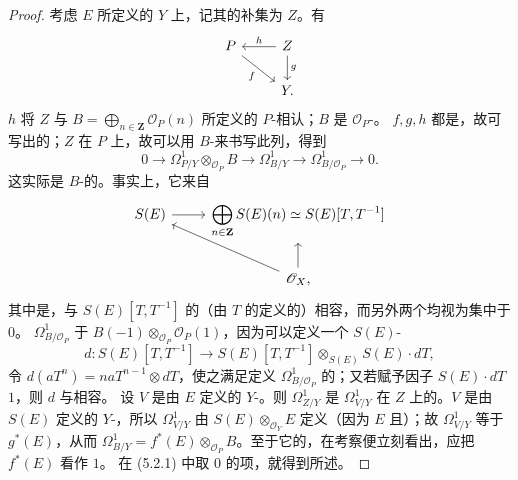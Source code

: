 \begin{proof}
考虑 $E$ 所定义的 $Y$ 上，记其的补集为 $Z$。有
\[
\begin{tikzcd}P\arrow[dr,"f"']&Z\arrow[l,"h"']\arrow[d,"g"]\\&Y.\end{tikzcd}
\]
 $h$ 将 $Z$ 与 $B=\bigoplus_{n\in\mathbf Z}\mathscr O_P(n)$ 所定义的 $P$-相认；$B$ 是 $\mathscr O_P$-。
$f,g,h$ 都是，故可写出的；$Z$ 在 $P$ 上，故可以用 $B$-来书写此列，得到
\[0\longrightarrow\Omega^1_{P/Y}\otimes_{\mathscr O_P}B\longrightarrow\Omega^1_{B/Y}\longrightarrow\Omega^1_{B/\mathscr O_P}\longrightarrow0.\tag{5.2.1}\]
这实际是 $B$-的。事实上，它来自
\[
\begin{tikzcd}S(E)\arrow[r]&\displaystyle\bigoplus_{n\in\mathbf Z}S(E)(n)\simeq S(E)[T,T^{-1}]\\&\mathscr O_X\arrow[ul]\arrow[u],\end{tikzcd}
\]
其中是，与 $S(E)[T,T^{-1}]$ 的（由 $T$ 的定义的）相容，而另外两个均视为集中于
 $0$。
 $\Omega^1_{B/\mathscr O_P}$ 于 $B(-1)\otimes_{\mathscr O_P}\mathscr O_P(1)$，因为可以定义一个 $S(E)$-
\[d:S(E)[T,T^{-1}]\longrightarrow S(E)[T,T^{-1}]\otimes_{S(E)}S(E)\cdot dT,\]
令 $d(aT^n)=naT^{n-1}\otimes dT$，使之满足定义 $\Omega^1_{B/\mathscr O_P}$ 的；又若赋予因子 $S(E)\cdot dT$  $1$，则 $d$ 与相容。
设 $V$ 是由 $E$ 定义的 $Y$-。则 $\Omega^1_{Z/Y}$ 是 $\Omega^1_{V/Y}$ 在 $Z$ 上的。$V$ 是由 $S(E)$ 定义的 $Y$-，所以 $\Omega^1_{V/Y}$ 由 $S(E)\otimes_{\mathscr O_Y}E$ 定义（因为 $E$ 且）；故 $\Omega^1_{V/Y}$ 等于 $g^*(E)$，从而 $\Omega^1_{B/Y}=f^*(E)\otimes_{\mathscr O_P}B$。至于它的，在考察便立刻看出，应把 $f^*(E)$ 看作 $1$。
在 (5.2.1) 中取 $0$ 的项，就得到所述。
\end{proof}
